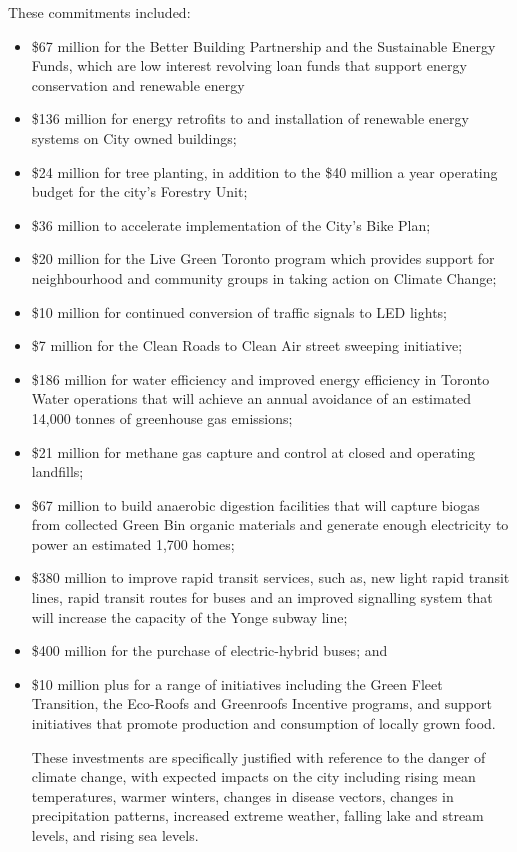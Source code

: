 These commitments included:
\begin{itemize}
	\item \$67 million for the Better Building Partnership and the Sustainable Energy Funds, 
which are low interest revolving loan funds that support energy conservation and 
renewable energy
	\item \$136 million for energy retrofits to and installation of renewable energy systems on 
City owned buildings; 
	\item \$24 million for tree planting, in addition to the \$40 million a year operating budget for 
the city's Forestry Unit; 
	\item \$36 million to accelerate implementation of the City's Bike Plan; 
	\item \$20 million for the Live Green Toronto program which provides support for 
neighbourhood and community groups in taking action on Climate Change; 
	\item \$10 million for continued conversion of traffic signals to LED lights; 
	\item \$7 million for the Clean Roads to Clean Air street sweeping initiative; 
	\item \$186 million for water efficiency and improved energy efficiency in Toronto Water 
operations that will achieve an annual avoidance of an estimated 14,000 tonnes of 
greenhouse gas emissions; 
	\item \$21 million for methane gas capture and control at closed and operating landfills; 
	\item \$67 million to build anaerobic digestion facilities that will capture biogas from 
collected Green Bin organic materials and generate enough electricity to power an 
estimated 1,700 homes; 
	\item \$380 million to improve rapid transit services, such as, new light rapid transit lines, 
rapid transit routes for buses and an improved signalling system that will increase the 
capacity of the Yonge subway line; 
	\item \$400 million for the purchase of electric-hybrid buses; and 
	\item \$10 million plus for a range of initiatives including the Green Fleet Transition, the 
Eco-Roofs and Greenroofs Incentive programs, and support initiatives that promote 
production and consumption of locally grown food.

These investments are specifically justified with reference to the danger of climate change, with expected impacts on the city including rising mean temperatures, warmer winters, changes in disease vectors, changes in precipitation patterns, increased extreme weather, falling lake and stream levels, and rising sea levels.\cite{TorontoEnvOff2008}


\end{itemize}
